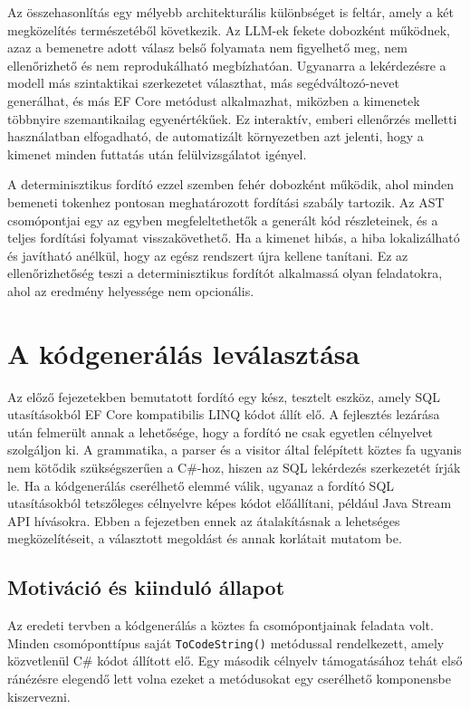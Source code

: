 \documentclass[a4paper,12pt]{article}
\begin{document}
Az összehasonlítás egy mélyebb architekturális különbséget is feltár, amely a két megközelítés természetéből következik. Az LLM-ek fekete dobozként működnek, azaz a bemenetre adott válasz belső folyamata nem figyelhető meg, nem ellenőrizhető és nem reprodukálható megbízhatóan. Ugyanarra a lekérdezésre a modell más szintaktikai szerkezetet választhat, más segédváltozó-nevet generálhat, és más EF Core metódust alkalmazhat, miközben a kimenetek többnyire szemantikailag egyenértékűek. Ez interaktív, emberi ellenőrzés melletti használatban elfogadható, de automatizált környezetben azt jelenti, hogy a kimenet minden futtatás után felülvizsgálatot igényel.

A determinisztikus fordító ezzel szemben fehér dobozként működik, ahol minden bemeneti tokenhez pontosan meghatározott fordítási szabály tartozik. Az AST csomópontjai egy az egyben megfeleltethetők a generált kód részleteinek, és a teljes fordítási folyamat visszakövethető. Ha a kimenet hibás, a hiba lokalizálható és javítható anélkül, hogy az egész rendszert újra kellene tanítani. Ez az ellenőrizhetőség teszi a determinisztikus fordítót alkalmassá olyan feladatokra, ahol az eredmény helyessége nem opcionális.

\section{A kódgenerálás leválasztása}

Az előző fejezetekben bemutatott fordító egy kész, tesztelt eszköz, amely SQL utasításokból EF Core kompatibilis LINQ kódot állít elő. A fejlesztés lezárása után felmerült annak a lehetősége, hogy a fordító ne csak egyetlen célnyelvet szolgáljon ki. A grammatika, a parser és a visitor által felépített köztes fa ugyanis nem kötődik szükségszerűen a C\#-hoz, hiszen az SQL lekérdezés szerkezetét írják le. Ha a kódgenerálás cserélhető elemmé válik, ugyanaz a fordító SQL utasításokból tetszőleges célnyelvre képes kódot előállítani, például Java Stream API hívásokra. Ebben a fejezetben ennek az átalakításnak a lehetséges megközelítéseit, a választott megoldást és annak korlátait mutatom be.

\subsection{Motiváció és kiinduló állapot}

Az eredeti tervben a kódgenerálás a köztes fa csomópontjainak feladata volt. Minden csomóponttípus saját \texttt{ToCodeString()} metódussal rendelkezett, amely közvetlenül C\# kódot állított elő. Egy második célnyelv támogatásához tehát első ránézésre elegendő lett volna ezeket a metódusokat egy cserélhető komponensbe kiszervezni.
\end{document}
